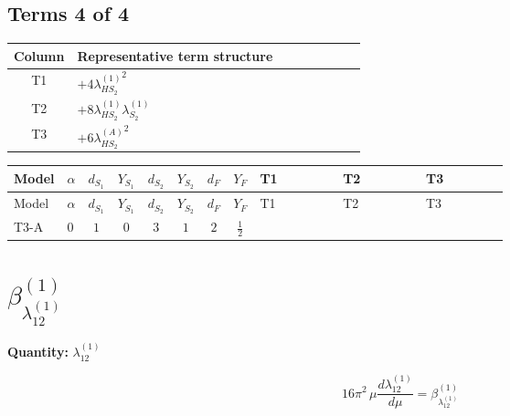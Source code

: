 \documentclass[8pt]{article}
\begin{document}
\begin{landscape}
\subsection*{Terms 4 of 4}
\begin{center}
\begin{tabular}{@{}c >{\raggedright\arraybackslash}p{0.82\linewidth}@{}}
\toprule
Column & Representative term structure \\
\midrule
T1 & \(\displaystyle +4 {\lambda_{HS_2}^{(1)}}^2\) \\
\midrule
T2 & \(\displaystyle +8 {\lambda_{HS_2}^{(1)}} {\lambda_{S_2}^{(1)}}\) \\
\midrule
T3 & \(\displaystyle +6 {\lambda_{HS_2}^{(A)}}^2\) \\
\midrule
\bottomrule
\end{tabular}
\end{center}
\smallskip
\tiny
\begin{longtable}{@{}llcccccc >{\raggedright\arraybackslash}p{0.21\linewidth} >{\raggedright\arraybackslash}p{0.21\linewidth} >{\raggedright\arraybackslash}p{0.21\linewidth}@{}}
\toprule
Model & $\alpha$ & $d_{S_1}$ & $Y_{S_1}$ & $d_{S_2}$ & $Y_{S_2}$ & $d_F$ & $Y_F$ & T1 & T2 & T3 \\
\midrule
\endfirsthead
\toprule
Model & $\alpha$ & $d_{S_1}$ & $Y_{S_1}$ & $d_{S_2}$ & $Y_{S_2}$ & $d_F$ & $Y_F$ & T1 & T2 & T3 \\
\midrule
\endhead
T3-A & $0$ & $1$ & $0$ & $3$ & $1$ & $2$ & $\frac{1}{2}$ & \scriptsize\adjustbox{max width=\linewidth}{$\begin{gathered} +4 {\lambda_{HS_2}^{(1)}}^2\end{gathered}$} & \scriptsize\adjustbox{max width=\linewidth}{$\begin{gathered} +8 {\lambda_{HS_2}^{(1)}} {\lambda_{S_2}^{(1)}}\end{gathered}$} & \scriptsize\adjustbox{max width=\linewidth}{$\begin{gathered} +6 {\lambda_{HS_2}^{(A)}}^2\end{gathered}$} \\
\midrule
\bottomrule
\end{longtable}
\clearpage
\section*{$\beta_{\lambda_{12}^{(1)}}^{(1)}$}
\noindent\textbf{Quantity: }$\lambda_{12}^{(1)}$\par\smallskip
\[16\pi^2\,\mu\frac{d \lambda_{12}^{(1)}}{d\mu}=\beta_{\lambda_{12}^{(1)}}^{(1)}\]

\end{landscape}
\end{document}
